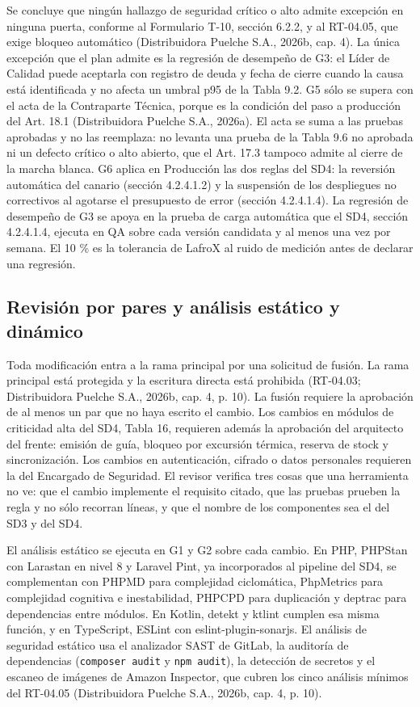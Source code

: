 Se concluye que ningún hallazgo de seguridad crítico o alto admite excepción en ninguna puerta, conforme al Formulario T-10, sección 6.2.2, y al RT-04.05, que exige bloqueo automático (Distribuidora Puelche S.A., 2026b, cap. 4). La única excepción que el plan admite es la regresión de desempeño de G3: el Líder de Calidad puede aceptarla con registro de deuda y fecha de cierre cuando la causa está identificada y no afecta un umbral p95 de la Tabla 9.2. G5 sólo se supera con el acta de la Contraparte Técnica, porque es la condición del paso a producción del Art. 18.1 (Distribuidora Puelche S.A., 2026a). El acta se suma a las pruebas aprobadas y no las reemplaza: no levanta una prueba de la Tabla 9.6 no aprobada ni un defecto crítico o alto abierto, que el Art. 17.3 tampoco admite al cierre de la marcha blanca. G6 aplica en Producción las dos reglas del SD4: la reversión automática del canario (sección 4.2.4.1.2) y la suspensión de los despliegues no correctivos al agotarse el presupuesto de error (sección 4.2.4.1.4). La regresión de desempeño de G3 se apoya en la prueba de carga automática que el SD4, sección 4.2.4.1.4, ejecuta en QA sobre cada versión candidata y al menos una vez por semana. El 10 \% es la tolerancia de LafroX al ruido de medición antes de declarar una regresión.

\subsection{Revisión por pares y análisis estático y dinámico}

Toda modificación entra a la rama principal por una solicitud de fusión. La rama principal está protegida y la escritura directa está prohibida (RT-04.03; Distribuidora Puelche S.A., 2026b, cap. 4, p. 10). La fusión requiere la aprobación de al menos un par que no haya escrito el cambio. Los cambios en módulos de criticidad alta del SD4, Tabla 16, requieren además la aprobación del arquitecto del frente: emisión de guía, bloqueo por excursión térmica, reserva de stock y sincronización. Los cambios en autenticación, cifrado o datos personales requieren la del Encargado de Seguridad. El revisor verifica tres cosas que una herramienta no ve: que el cambio implemente el requisito citado, que las pruebas prueben la regla y no sólo recorran líneas, y que el nombre de los componentes sea el del SD3 y del SD4.

El análisis estático se ejecuta en G1 y G2 sobre cada cambio. En PHP, PHPStan con Larastan en nivel 8 y Laravel Pint, ya incorporados al pipeline del SD4, se complementan con PHPMD para complejidad ciclomática, PhpMetrics para complejidad cognitiva e inestabilidad, PHPCPD para duplicación y deptrac para dependencias entre módulos. En Kotlin, detekt y ktlint cumplen esa misma función, y en TypeScript, ESLint con eslint-plugin-sonarjs. El análisis de seguridad estático usa el analizador SAST de GitLab, la auditoría de dependencias (\texttt{composer audit} y \texttt{npm audit}), la detección de secretos y el escaneo de imágenes de Amazon Inspector, que cubren los cinco análisis mínimos del RT-04.05 (Distribuidora Puelche S.A., 2026b, cap. 4, p. 10).

